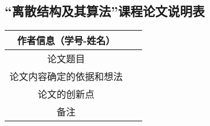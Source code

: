 \begin{center}
    \section*{“离散结构及其算法”课程论文说明表}
    \begin{tabular}{|c|c|}
        \hline
        作者信息（学号-姓名）  & ~ \\ \hline
        论文题目         & ~ \\ \hline
        论文内容确定的依据和想法 & ~ \\    \hline
        论文的创新点       & ~ \\ \hline
        备注           & ~ \\ \hline
    \end{tabular}
\end{center}
\clearpage
